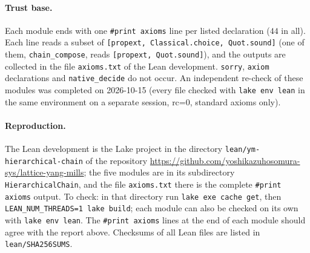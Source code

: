 \documentclass[11pt,a4paper]{article}
\theoremstyle{definition}
\theoremstyle{remark}
\newcommand{\code}[1]{\texttt{#1}}
\begin{document}
\paragraph{Trust base.}
Each module ends with one \code{\#print axioms} line per listed declaration ($44$ in all).
Each line reads a subset of \code{[propext, Classical.choice, Quot.sound]} (one of them, \code{chain\_compose}, reads \code{[propext, Quot.sound]}), and the outputs are collected in the file \code{axioms.txt} of the Lean development.
\code{sorry}, \code{axiom} declarations and \code{native\_decide} do not occur.
An independent re-check of these modules was completed on 2026-10-15 (every file checked with \code{lake env lean} in the same environment on a separate session, rc=0, standard axioms only).

{\sloppy\paragraph{Reproduction.}
The Lean development is the Lake project in the directory \code{lean/\allowbreak{}ym-hierarchical-chain} of the repository \url{https://github.com/yoshikazuhosomura-sys/lattice-yang-mills}; the five modules are in its subdirectory \code{HierarchicalChain}, and the file \code{axioms.txt} there is the complete \code{\#print axioms} output.
To check: in that directory run \code{lake exe cache get}, then \code{LEAN\_NUM\_THREADS=1 lake build}; each module can also be checked on its own with \code{lake env lean}. The \code{\#print axioms} lines at the end of each module should agree with the report above.
Checksums of all Lean files are listed in \code{lean/SHA256SUMS}.\par}
\end{document}

